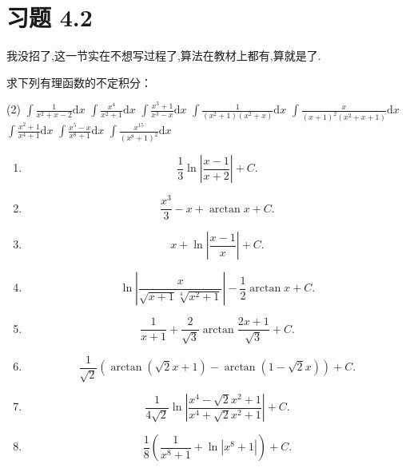 \section{习题 4.2}

我没招了,这一节实在不想写过程了,算法在教材上都有,算就是了.

\begin{exercise}[4.2.1]
    求下列有理函数的不定积分：

    \begin{tasks}(2)
        \task $\displaystyle \int \frac{1}{x^2 + x - 2}\mathrm{d}x$
        \task $\displaystyle \int \frac{x^4}{x^2 + 1}\mathrm{d}x$
        \task $\displaystyle \int \frac{x^3 + 1}{x^3 - x}\mathrm{d}x$
        \task $\displaystyle \int \frac{1}{(x^2 + 1)(x^2 + x)}\mathrm{d}x$
        \task $\displaystyle \int \frac{x}{(x + 1)^2 (x^2 + x + 1)}\mathrm{d}x$
        \task $\displaystyle \int \frac{x^2 + 1}{x^4 + 1}\mathrm{d}x$
        \task $\displaystyle \int \frac{x^5 - x}{x^8 + 1}\mathrm{d}x$
        \task $\displaystyle \int \frac{x^{15}}{(x^8 + 1)^2}\mathrm{d}x$
    \end{tasks}
\end{exercise}

\begin{solution}
    \begin{enumerate}
        \item $$\frac{1}{3} \ln \left| \frac{x - 1}{x + 2} \right| + C.$$
        \item $$\frac{x^3}{3} - x + \arctan x + C.$$
        \item $$x + \ln \left| \frac{x-1}{x} \right| + C.$$
        \item $$\ln \left| \frac{x}{\sqrt{x+1}\sqrt[4]{x^2 + 1}} \right| - \frac{1}{2} \arctan x + C.$$
        \item $$\frac{1}{x+1} + \frac{2}{\sqrt 3} \arctan \frac{2x + 1}{\sqrt 3} + C.$$
        \item $$\frac{1}{\sqrt{2}} \left( \arctan \left( \sqrt{2} x + 1 \right) - \arctan \left( 1 - \sqrt{2} x \right) \right) + C.$$
        \item $$\frac{1}{4\sqrt{2}} \ln \left| \frac{x^4 - \sqrt{2} x^2 + 1}{x^4 + \sqrt{2} x^2 + 1} \right| + C.$$
        \item $$\frac{1}{8} \left( \frac{1}{x^8 + 1} + \ln |x^8 + 1| \right) + C.$$
    \end{enumerate}
\end{solution}

